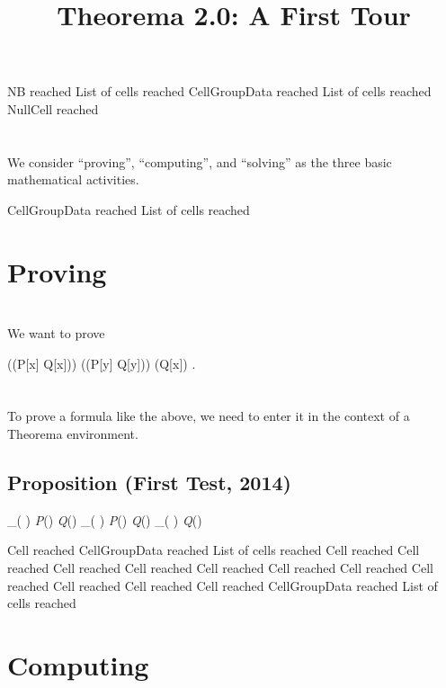 \documentclass{article}
\newcommand{\light}[1]{{\color{lightgray}#1}}
\newcommand{\IffTM}[2]{#1 \leftrightarrow #2}
\newcommand{\AndTM}[2]{#1 \wedge #2}
\newcommand{\ForallTM}[2]{\forall_{#1} #2}
\newcommand{\RNG}[1]{#1}
\newcommand{\SIMPRNG}[1]{\left( #1 \right)}
\newcommand{\VarTM}[1]{\mathit{#1}}
\newcommand{\OrTM}[2]{#1 \vee #2}
\newcommand{\Predicate}[2]{\textit{#1}\left(#2\right)} %
\newcommand{\ImpliesTM}[2]{#1 \implies #2}
\begin{document}
% 

\title{Theorema 2.0: A First Tour}
\author{}
\date{}
\maketitle

\light{NB reached} \light{List of cells reached} \light{CellGroupData reached} \light{List of cells reached} Null\light{Cell reached} \begingroup \section*{} We consider “proving”, “computing”, and “solving” as the three basic mathematical activities.\endgroup 

\light{CellGroupData reached} \light{List of cells reached} \section{Proving}

\begingroup \section*{} We want to prove\endgroup 

\begin{center}((P[x] \lor Q[x])) \land ((P[y] \Rightarrow Q[y])) \Leftrightarrow (Q[x]) .\end{center}
\begingroup \section*{} To prove a formula like the above, we need to enter it in the context of a Theorema environment.\endgroup 

\begin{openenvironment}
\end{openenvironment}\begin{tmaenvironment}
\subsection{Proposition (First Test, 2014)}
\IffTM{\AndTM{\ForallTM{\RNG{\SIMPRNG{\VarTM{x}}}}{\OrTM{\Predicate{P}{\VarTM{x}}}{\Predicate{Q}{\VarTM{x}}}}}{\ForallTM{\RNG{\SIMPRNG{\VarTM{y}}}}{\ImpliesTM{\Predicate{P}{\VarTM{y}}}{\Predicate{Q}{\VarTM{y}}}}}}{\ForallTM{\RNG{\SIMPRNG{\VarTM{x}}}}{\Predicate{Q}{\VarTM{x}}}}\end{tmaenvironment}
\light{Cell reached} \light{CellGroupData reached} \light{List of cells reached} \light{Cell reached} \light{Cell reached} \light{Cell reached} \light{Cell reached} \light{Cell reached} \light{Cell reached} \light{Cell reached} \light{Cell reached} \light{Cell reached} \light{Cell reached} \light{Cell reached} \light{CellGroupData reached} \light{List of cells reached} \section{Computing}
\end{document}
